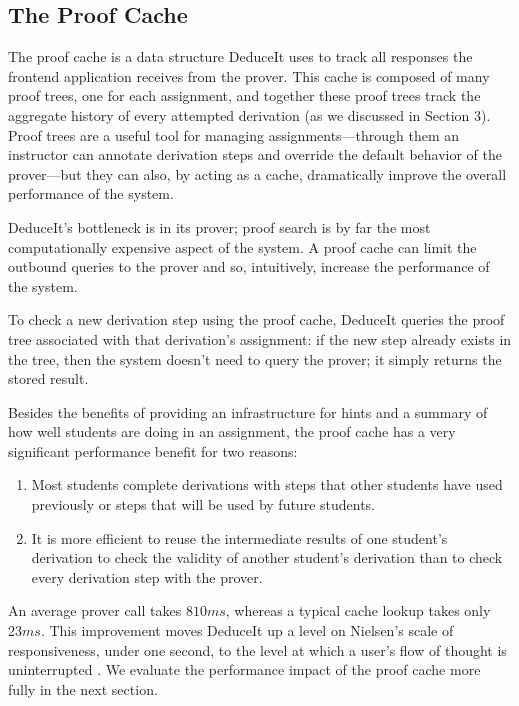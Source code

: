 \documentclass{sigchi}
\newcommand{\msb}[1]{\textbf{\textcolor{cyan}{Michael: #1}}}
\begin{document}
\subsection{The Proof Cache}

The proof cache is a data structure DeduceIt uses to track all responses the frontend application receives from the prover. This cache is composed of many proof trees, one for each assignment, and together these proof trees track the aggregate history of every attempted derivation (as we discussed in Section 3). Proof trees are a useful tool for managing assignments---through them an instructor can annotate derivation steps and override the default behavior of the prover---but they can also, by acting as a cache, dramatically improve the overall performance of the system. 

DeduceIt's bottleneck is in its prover; proof search is by far the most computationally expensive aspect of the system. A proof cache can limit the outbound queries to the prover and so, intuitively, increase the performance of the system. 

To check a new derivation step using the proof cache, DeduceIt queries the proof tree associated with that derivation's assignment: if the new step already exists in the tree, then the system doesn't need to query the prover; it simply returns the stored result. %

Besides the benefits of providing an infrastructure for hints and a summary of how well students are doing in an assignment, the proof cache has a very significant performance benefit for two reasons:
\begin{enumerate}
  \item Most students complete derivations with steps that other students have used previously or steps that will be used by future students.
  \item It is more efficient to reuse the intermediate results of one student's derivation to check the validity of another student's derivation than to check every derivation step with the prover. \label{hyp:2}
\end{enumerate}  
An average prover call takes $810ms$, whereas a typical cache lookup takes only $23ms$. This improvement moves DeduceIt up a level on Nielsen's scale of responsiveness, under one second, to the level at which a user's flow of thought is uninterrupted \cite{neilsen}. We evaluate the performance impact of the proof cache more fully in the next section.
\end{document}
